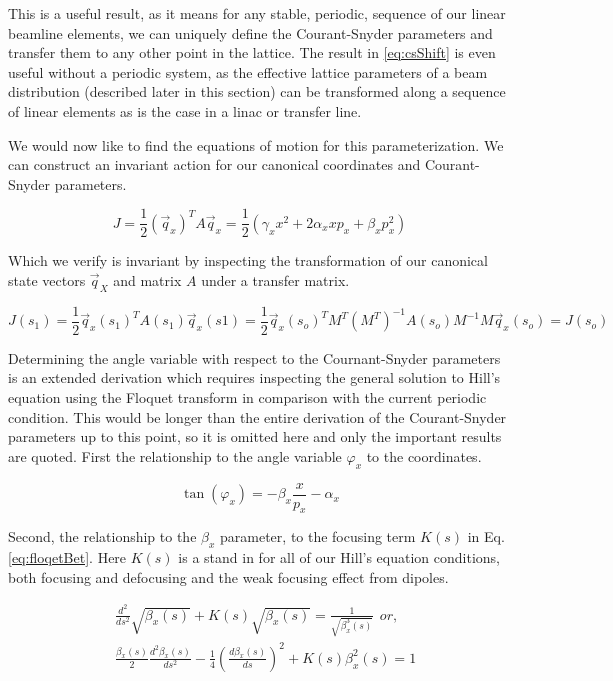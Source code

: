 This is a useful result, as it means for any stable, periodic, sequence of our linear beamline elements, we can uniquely define the Courant-Snyder parameters and transfer them to any other point in the lattice. The result in \ref{eq:csShift} is even useful without a periodic system, as the effective lattice parameters of a beam distribution (described later in this section) can be transformed along a sequence of linear elements as is the case in a linac or transfer line.

We would now like to find the equations of motion for this parameterization. We can construct an invariant action for our canonical coordinates and Courant-Snyder parameters.

\begin{equation} \label{eq:csJ}
	J = \frac{1}{2} (\vec{q}_x)^T A \vec{q}_x = \frac{1}{2} (\gamma_x x^2 + 2\alpha_x x p_x + \beta_x p_x^2)
\end{equation}

Which we verify is invariant by inspecting the transformation of our canonical state vectors $\vec{q}_X$ and matrix $A$ under a transfer matrix.

\begin{equation} \label{eq:Jinvariant}
	J(s_1) = \frac{1}{2} \vec{q}_x(s_1)^T A(s_1) \vec{q}_x(s1) = \frac{1}{2} \vec{q}_x(s_o)^T M^T (M^T)^{-1} A(s_o) M^{-1}  M \vec{q}_x(s_o) = J(s_o)
\end{equation}

Determining the angle variable with respect to the Cournant-Snyder parameters is an extended derivation which requires inspecting the general solution to Hill's equation using the Floquet transform in comparison with the current periodic condition. This would be longer than the entire derivation of the Courant-Snyder parameters up to this point, so it is omitted here and only the important results are quoted. First the relationship to the angle variable $\varphi_x$ to the coordinates.

\begin{equation} \label{eq:csAngle}
	\tan{(\varphi_x)} = -\beta_x \frac{x}{p_x} - \alpha_x 
\end{equation}

Second, the relationship to the $\beta_x$ parameter, to the focusing term $K(s)$ in Eq. \ref{eq:floqetBet}. Here $K(s)$ is a stand in for all of our Hill's equation conditions, both focusing and defocusing and the weak focusing effect from dipoles. 

\begin{equation} \label{eq:floqetBet}
	\begin{split}
	&\frac{d^2}{ds^2}\sqrt{\beta_x(s)} + K(s)\sqrt{\beta_x(s)} = \frac{1}{\sqrt{\beta_x^3(s)}} \hspace{5pt} or,\\ 
	&\frac{\beta_x(s)}{2}\frac{d^2\beta_x(s)}{ds^2} - \frac{1}{4}\left(\frac{d\beta_x(s)}{ds}\right)^2 + K(s)\beta_x^2(s) = 1
	\end{split}
\end{equation}

